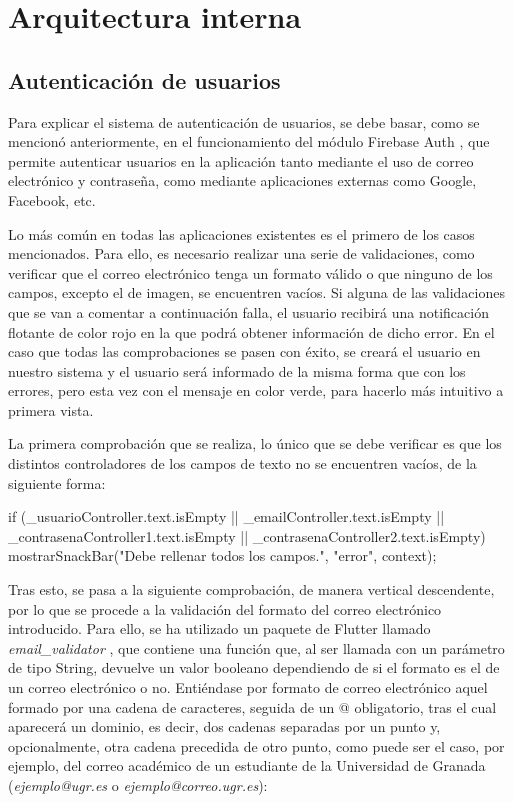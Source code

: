 \documentclass{article}
\begin{document}
\section{Arquitectura interna}

\subsection{Autenticación de usuarios}

Para explicar el sistema de autenticación de usuarios, se debe basar, como se mencionó anteriormente, en el funcionamiento del módulo Firebase Auth \cite{Firebase Authentication}, que permite autenticar usuarios en la aplicación tanto mediante el uso de correo electrónico y contraseña, como mediante aplicaciones externas como Google, Facebook, etc.

Lo más común en todas las aplicaciones existentes es el primero de los casos mencionados. Para ello, es necesario realizar una serie de validaciones, como verificar que el correo electrónico tenga un formato válido o que ninguno de los campos, excepto el de imagen, se encuentren vacíos. Si alguna de las validaciones que se van a comentar a continuación falla, el usuario recibirá una notificación flotante de color rojo en la que podrá obtener información de dicho error. En el caso que todas las comprobaciones se pasen con éxito, se creará el usuario en nuestro sistema y el usuario será informado de la misma forma que con los errores, pero esta vez con el mensaje en color verde, para hacerlo más intuitivo a primera vista.

La primera comprobación que se realiza, lo único que se debe verificar es que los distintos controladores de los campos de texto no se encuentren vacíos, de la siguiente forma:

\vspace{0.5cm}
\begin{codigo}
if (_usuarioController.text.isEmpty || 
    _emailController.text.isEmpty ||
    _contrasenaController1.text.isEmpty ||
    _contrasenaController2.text.isEmpty)
{
    mostrarSnackBar("Debe rellenar todos los campos.", "error", context);
}
\end{codigo}

Tras esto, se pasa a la siguiente comprobación, de manera vertical descendente, por lo que se procede a la validación del formato del correo electrónico introducido. Para ello, se ha utilizado un paquete de Flutter llamado \textit{email\_validator} \cite{Email Validator}, que contiene una función que, al ser llamada con un parámetro de tipo String, devuelve un valor booleano dependiendo de si el formato es el de un correo electrónico o no. Entiéndase por formato de correo electrónico aquel formado por una cadena de caracteres, seguida de un @ obligatorio, tras el cual aparecerá un dominio, es decir, dos cadenas separadas por un punto y, opcionalmente, otra cadena precedida de otro punto, como puede ser el caso, por ejemplo, del correo académico de un estudiante de la Universidad de Granada (\textit{ejemplo@ugr.es} o \textit{ejemplo@correo.ugr.es}):
\end{document}
